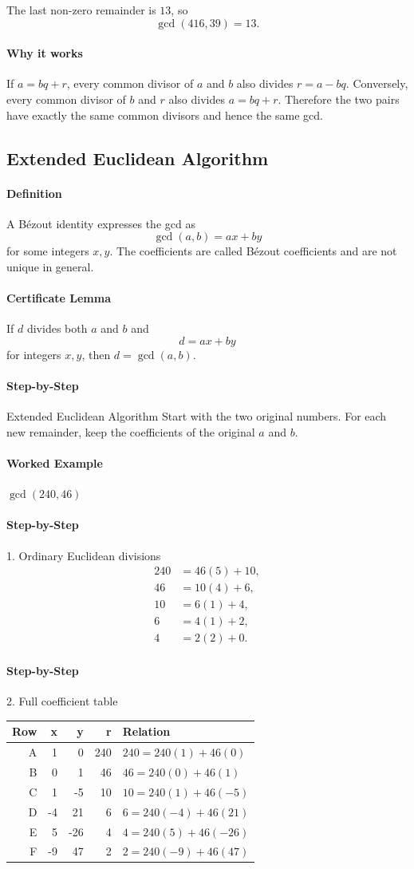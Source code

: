 \documentclass[12pt]{article}
\newcommand{\Definition}{\paragraph{Definition}}
\newcommand{\Step}{\paragraph{Step-by-Step}}
\newcommand{\Exam}{\paragraph{Worked Example}}
\begin{document}
The last non-zero remainder is $13$, so
\[
\boxed{\gcd(416,39)=13}.
\]

\paragraph{Why it works}
If $a=bq+r$, every common divisor of $a$ and $b$ also divides $r=a-bq$. Conversely, every common divisor of $b$ and $r$ also divides $a=bq+r$. Therefore the two pairs have exactly the same common divisors and hence the same gcd.

\subsection{Extended Euclidean Algorithm}
\Definition A B\'ezout identity expresses the gcd as
\[
\gcd(a,b)=ax+by
\]
for some integers $x,y$. The coefficients are called B\'ezout coefficients and are not unique in general.

\paragraph{Certificate Lemma}
If $d$ divides both $a$ and $b$ and
\[
d=ax+by
\]
for integers $x,y$, then $d=\gcd(a,b)$.

\Step{Extended Euclidean Algorithm}
Start with the two original numbers. For each new remainder, keep the coefficients of the original $a$ and $b$.

\Exam{$\gcd(240,46)$}

\Step{1. Ordinary Euclidean divisions}
\begin{align*}
240&=46(5)+10,\\
46&=10(4)+6,\\
10&=6(1)+4,\\
6&=4(1)+2,\\
4&=2(2)+0.
\end{align*}

\Step{2. Full coefficient table}
\begin{table}[H]
\centering
\small
\begin{tabular}{r r r r l}
\toprule
Row & x & y & r & Relation\\
\midrule
A & 1 & 0 & 240 & $240=240(1)+46(0)$\\
B & 0 & 1 & 46 & $46=240(0)+46(1)$\\
C & 1 & -5 & 10 & $10=240(1)+46(-5)$\\
D & -4 & 21 & 6 & $6=240(-4)+46(21)$\\
E & 5 & -26 & 4 & $4=240(5)+46(-26)$\\
F & -9 & 47 & 2 & $2=240(-9)+46(47)$\\
\bottomrule
\end{tabular}
\end{table}
\end{document}
